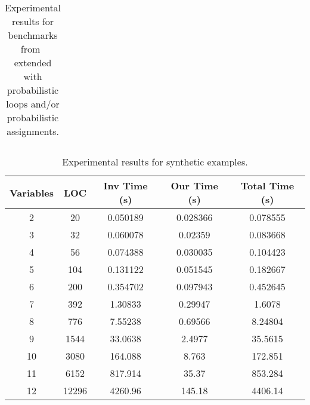 \begin{center}
\begin{table}[]
\begin{tabular}{c|c|c|c|c|c}
\end{tabular}
\caption{Experimental results for benchmarks from~\cite{ADFG10:lexicographic} extended with probabilistic loops and/or probabilistic assignments.} \label{tab:exp1}
\end{table}
\end{center}

\begin{center}
\begin{table}[]
  \centering
   \begin{tabular}{c|c|c|c|c}

{Variables} & {LOC} & {Inv Time (s)} & {Our Time (s)} & {Total Time (s)} \\\hline
{2} & {20} & {0.050189} & {0.028366} & {0.078555} \\\hline
{3} & {32} & {0.060078} & {0.02359} & {0.083668} \\\hline
{4} & {56} & {0.074388} & {0.030035} & {0.104423} \\\hline
{5} & {104} & {0.131122} & {0.051545} & {0.182667} \\\hline
{6} & {200} & {0.354702} & {0.097943} & {0.452645} \\\hline
{7} & {392} & {1.30833} & {0.29947} & {1.6078} \\\hline
{8} & {776} & {7.55238} & {0.69566} & {8.24804} \\\hline
{9} & {1544} & {33.0638} & {2.4977} & {35.5615} \\\hline
{10} & {3080} & {164.088} & {8.763} & {172.851} \\\hline
{11} & {6152} & {817.914} & {35.37} & {853.284} \\\hline
{12} & {12296} & {4260.96} & {145.18} & {4406.14} \\\hline
\end{tabular}
\caption{Experimental results for synthetic examples.}\label{tab:exp2}
\end{table}
\end{center}
